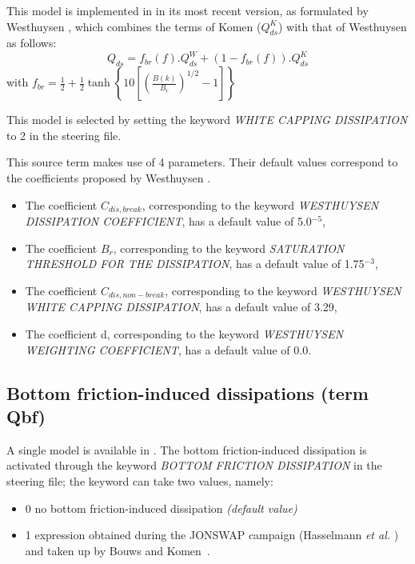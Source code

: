  This model is implemented in \tomawac in its most recent version, as formulated by Westhuysen \cite{Westhuys2008}, which combines the terms of Komen \cite{Komen1984} ($Q_{ds}^{K}$) with that of Westhuysen \cite{Westhuys2007} as follows:
\begin{equation} \label{GrindEQ__4_41_}
Q_{ds} =f_{br} (f).Q_{ds} ^{W} +\left(1-f_{br} (f)\right).Q_{ds} ^{K}
\end{equation}
with $f_{br} =\frac{1}{2} +\frac{1}{2} \tanh \left\{10\left[\left(\frac{B(k)}{B_{r} } \right)^{1/2} -1\right]\right\}$

 This model is selected by setting the keyword \textit{WHITE CAPPING DISSIPATION} to 2 in the steering file.\textbf{}

 This source term makes use of 4 parameters. Their default values correspond to the coefficients proposed by Westhuysen  \cite{Westhuys2008}.

\begin{itemize}
\item  The coefficient ${C}_{dis,break}$, corresponding to the keyword \textit{WESTHUYSEN  DISSIPATION COEFFICIENT}, has a default value of 5.0${}^{-5}$,
\item  The coefficient ${B}_{r}$, corresponding to the keyword \textit{SATURATION THRESHOLD FOR THE DISSIPATION}, has a default value of 1.75${}^{-3}$,
\item  The coefficient ${C}_{dis,non-break}$, corresponding to the keyword \textit{WESTHUYSEN WHITE CAP\-PING DISSIPATION}, has a default value of 3.29,
\item  The coefficient d, corresponding to the keyword \textit{WESTHUYSEN WEIGHTING COEFFICIENT}, has a default value of 0.0.
\end{itemize}


\subsection{ Bottom friction-induced dissipations (term Qbf)}
\label{BOTTOMFRICTION}
 A single model is available in \tomawac. The bottom friction-induced dissipation is activated through the keyword \textit{BOTTOM FRICTION DISSIPATION} in the steering file; the keyword can take two values, namely:

 \begin{itemize}
\item 0 no bottom friction-induced dissipation \textit{(default value)}

\item 1 expression obtained during the JONSWAP campaign (Hasselmann \textit{et al.} \cite{Hasselmann1973}) and taken up by Bouws and Komen~\cite{Bouws1983}.
\end{itemize}

